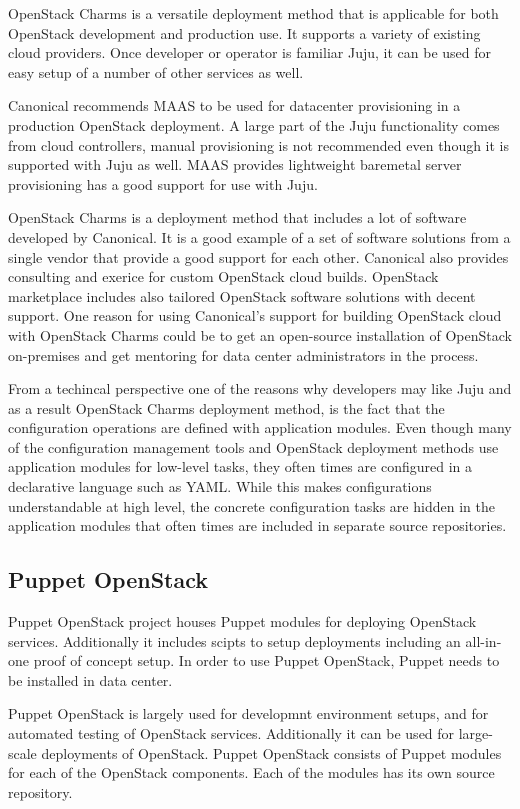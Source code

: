 OpenStack Charms is a versatile deployment method that is applicable for both
OpenStack development and production use. It supports a variety of existing
cloud providers. Once developer or operator is familiar Juju, it can be used
for easy setup of a number of other services as well.

Canonical recommends MAAS to be used for datacenter provisioning in a
production OpenStack deployment. A large part of the Juju functionality comes
from cloud controllers, manual provisioning is not recommended even though it
is supported with Juju as well. MAAS provides lightweight baremetal server
provisioning has a good support for use with Juju.

OpenStack Charms is a deployment method that includes a lot of software
developed by Canonical. It is a good example of a set of software solutions
from a single vendor that provide a good support for each other. Canonical also
provides consulting and exerice for custom OpenStack cloud builds.  OpenStack
marketplace includes also tailored OpenStack software solutions with decent
support. One reason for using Canonical's support for building OpenStack cloud
with OpenStack Charms could be to get an open-source installation of OpenStack
on-premises and get mentoring for data center administrators in the process.

From a techincal perspective one of the reasons why developers may like Juju
and as a result OpenStack Charms deployment method, is the fact that the
configuration operations are defined with application modules. Even though many
of the configuration management tools and OpenStack deployment methods use
application modules for low-level tasks, they often times are configured in a
declarative language such as YAML. While this makes configurations
understandable at high level, the concrete configuration tasks are hidden in
the application modules that often times are included in separate source
repositories.

\subsection{Puppet OpenStack}

Puppet OpenStack project houses Puppet \cite{puppet-deployment-guide} modules
for deploying OpenStack services. Additionally it includes scipts to setup
deployments including an all-in-one proof of concept setup. In order to use
Puppet OpenStack, Puppet needs to be installed in data center.

Puppet OpenStack is largely used for developmnt environment setups, and for
automated testing of OpenStack services. Additionally it can be used for
large-scale deployments of OpenStack. Puppet OpenStack consists of Puppet
modules for each of the OpenStack components. Each of the modules has its own
source repository.

